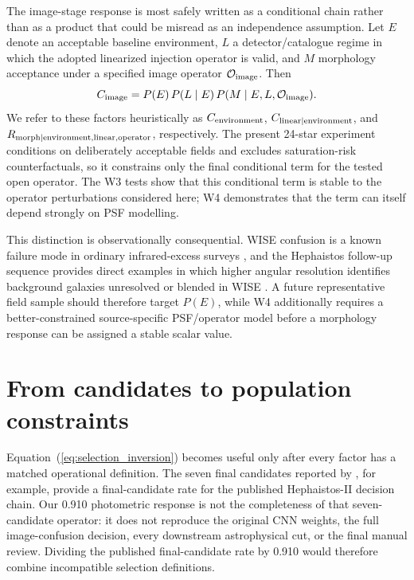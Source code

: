 \documentclass[fleqn,usenatbib]{mnras}
\begin{document}
The image-stage response is most safely written as a conditional chain rather than as a product that could be misread as an independence assumption. Let $E$ denote an acceptable baseline environment, $L$ a detector/catalogue regime in which the adopted linearized injection operator is valid, and $M$ morphology acceptance under a specified image operator $\mathcal{O}_{\rm image}$. Then
\begin{equation}
C_{\rm image}
=P(E)\,P(L\mid E)\,P(M\mid E,L,\mathcal{O}_{\rm image}).
\label{eq:image_decomp}
\end{equation}
We refer to these factors heuristically as $C_{\rm environment}$, $C_{\rm linear\mid environment}$, and $R_{\rm morph\mid environment,linear,operator}$, respectively. The present 24-star experiment conditions on deliberately acceptable fields and excludes saturation-risk counterfactuals, so it constrains only the final conditional term for the tested open operator. The W3 tests show that this conditional term is stable to the operator perturbations considered here; W4 demonstrates that the term can itself depend strongly on PSF modelling.

This distinction is observationally consequential. WISE confusion is a known failure mode in ordinary infrared-excess surveys \citep{KennedyWyatt2012}, and the Hephaistos follow-up sequence provides direct examples in which higher angular resolution identifies background galaxies unresolved or blended in WISE \citep{Ren2025,Ren2026,Zackrisson2026}. A future representative field sample should therefore target $P(E)$, while W4 additionally requires a better-constrained source-specific PSF/operator model before a morphology response can be assigned a stable scalar value.

\section{From candidates to population constraints}
\label{sec:population}

Equation~(\ref{eq:selection_inversion}) becomes useful only after every factor has a matched operational definition. The seven final candidates reported by \citet{Suazo2024}, for example, provide a final-candidate rate for the published Hephaistos-II decision chain. Our 0.910 photometric response is not the completeness of that seven-candidate operator: it does not reproduce the original CNN weights, the full image-confusion decision, every downstream astrophysical cut, or the final manual review. Dividing the published final-candidate rate by 0.910 would therefore combine incompatible selection definitions.
\end{document}
